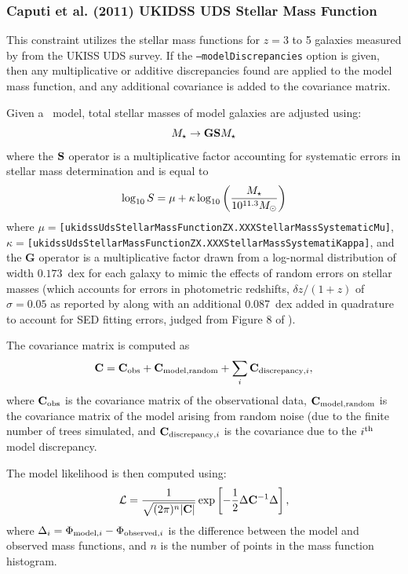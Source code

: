 \subsubsection{Caputi et al. (2011) UKIDSS UDS Stellar Mass Function}\label{sec:ConstraintsUKIDSSUDSStellarMassFunction}

This constraint utilizes the stellar mass functions for $z = 3$ to 5 galaxies measured by \cite{caputi_stellar_2011} from the UKISS UDS survey.  If the {\tt --modelDiscrepancies} option is given, then any multiplicative or additive discrepancies found are applied to the model mass function, and any additional covariance is added to the covariance matrix.

Given a \glc\ model, total stellar masses of model galaxies are adjusted using:
\begin{equation}
 M_\star \rightarrow {\bf G} {\bf S} M_\star 
\end{equation}
where the ${\bf S}$ operator is a multiplicative factor accounting for systematic errors in stellar mass determination and is equal to \citep{behroozi_comprehensive_2010}
\begin{equation}
 \log_{\rm 10} S = \mu + \kappa \log_{\rm 10} \left({M_\star \over 10^{11.3}M_\odot}\right)
\end{equation}
where $\mu=${\tt [ukidssUdsStellarMassFunctionZX.XXXStellarMassSystematicMu]}, $\kappa=${\tt [ukidssUdsStellarMassFunctionZX.XXXStellarMassSystematiKappa]}, and the {\bf G} operator is a multiplicative factor drawn from a log-normal distribution of width $0.173$~dex for each galaxy to mimic the effects of random errors on stellar masses (which accounts for errors in photometric redshifts, $\delta z/(1+z)$ of $\sigma=0.05$ as reported by \cite{caputi_stellar_2011} along with an additional 0.087~dex added in quadrature to account for SED fitting errors, judged from Figure 8 of \cite{caputi_stellar_2011}).

The covariance matrix is computed as
\begin{equation}
 {\bf C} = {\bf C}_{\rm obs} + {\bf C}_{\rm model,random} + \sum_i {\bf C}_{{\rm discrepancy}, i},
\end{equation}
where ${\bf C}_{\rm obs}$ is the covariance matrix of the observational data, ${\bf C}_{\rm model,random}$ is the covariance matrix of the model arising from random noise (due to the finite number of trees simulated, and ${\bf C}_{{\rm discrepancy}, i}$ is the covariance due to the $i^{\rm th}$ model discrepancy.

The model likelihood is then computed using:
\begin{equation}
 \mathcal{L} = {1 \over \sqrt{(2 \pi)^n |{\bf C}|}} \exp\left[ -{1\over 2} \Delta {\bf C}^{-1} \Delta \right],
\end{equation}
where $\Delta_i = \Phi_{{\rm model}, i} - \Phi_{{\rm observed}, i}$ is the difference between the model and observed mass functions, and $n$ is the number of points in the mass function histogram.

